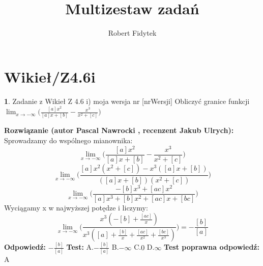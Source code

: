 \documentclass[12pt, a4paper]{article}
\title{Multizestaw zadań}
\author{Robert Fidytek}
\date{}
\theoremstyle{definition} %
\newtheorem{zad}{}
\newcommand{\kategoria}[1]{\section{#1}} %
\newcommand{\zadStart}[1]{\begin{zad}#1\newline} %
\newcommand{\zadStop}{\end{zad}}   %
\newcommand{\rozwStart}[2]{\noindent \textbf{Rozwiązanie (autor #1 , recenzent #2): }\newline} %
\newcommand{\rozwStop}{\newline}                                            %
\newcommand{\odpStart}{\noindent \textbf{Odpowiedź:}\newline}    %
\newcommand{\odpStop}{\newline}                                             %
\newcommand{\testStart}{\noindent \textbf{Test:}\newline} %
\newcommand{\testStop}{\newline} %
\newcommand{\kluczStart}{\noindent \textbf{Test poprawna odpowiedź:}\newline} %
\newcommand{\kluczStop}{\newline} %
\begin{document}
\maketitle


\kategoria{Wikieł/Z4.6i}
\zadStart{Zadanie z Wikieł Z 4.6 i) moja wersja nr [nrWersji]}
Obliczyć granice funkcji $\displaystyle{\lim_{x \to -\infty}}\bigg(\frac{[a]x^2}{[a]x+[b]}-\frac{x^3}{x^2+[c]}\bigg)$
\zadStop
\rozwStart{Pascal Nawrocki}{Jakub Ulrych}
Sprowadzamy do wspólnego mianownika:
$$\displaystyle{\lim_{x \to -\infty}}\bigg(\frac{[a]x^2}{[a]x+[b]}-\frac{x^3}{x^2+[c]}\bigg)$$
$$\displaystyle{\lim_{x \to -\infty}}\bigg(\frac{[a]x^2(x^2+[c])-x^3([a]x+[b])}{([a]x+[b])(x^2+[c])}\bigg)$$
$$\displaystyle{\lim_{x \to -\infty}}\bigg(\frac{-[b]x^3+[ac]x^2}{[a]x^3+[b]x^2+[ac]x+[bc]}\bigg)$$
Wyciągamy x w najwyższej potędze i liczymy:
$$\displaystyle{\lim_{x \to -\infty}}\bigg(\frac{x^3(-[b]+\frac{[ac]}{x})}{x^3([a]+\frac{[b]}{x}+\frac{[ac]}{x^2}+\frac{[bc]}{x^3})}\bigg)=-\frac{[b]}{[a]}$$
\rozwStop
\odpStart
$-\frac{[b]}{[a]}$
\odpStop
\testStart
A.$-\frac{[b]}{[a]}$
B.$-\infty$
C.$0$
D.$\infty$
\testStop
\kluczStart
A
\kluczStop
\end{document}
